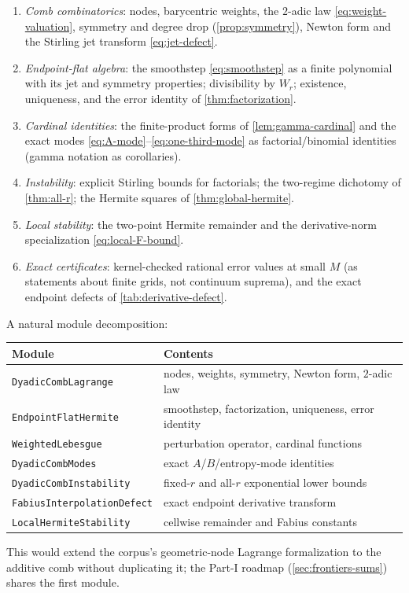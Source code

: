 \documentclass[11pt,oneside]{article}
\numberwithin{equation}{section}
\theoremstyle{definition}
\theoremstyle{remark}
\begin{document}
\begin{enumerate}
\item\emph{Comb combinatorics}: nodes, barycentric weights, the
$2$-adic law \eqref{eq:weight-valuation}, symmetry and degree drop
(\cref{prop:symmetry}), Newton form and the Stirling jet transform
\eqref{eq:jet-defect}.
\item\emph{Endpoint-flat algebra}: the smoothstep
\eqref{eq:smoothstep} as a finite polynomial with its jet and
symmetry properties; divisibility by $W_r$; existence, uniqueness,
and the error identity of \cref{thm:factorization}.
\item\emph{Cardinal identities}: the finite-product forms of
\cref{lem:gamma-cardinal} and the exact modes
\eqref{eq:A-mode}--\eqref{eq:one-third-mode} as factorial/binomial
identities (gamma notation as corollaries).
\item\emph{Instability}: explicit Stirling bounds for factorials; the
two-regime dichotomy of \cref{thm:all-r}; the Hermite squares of
\cref{thm:global-hermite}.
\item\emph{Local stability}: the two-point Hermite remainder and the
derivative-norm specialization \eqref{eq:local-F-bound}.
\item\emph{Exact certificates}: kernel-checked rational error values
at small $M$ (as statements about finite grids, not continuum
suprema), and the exact endpoint defects of
\cref{tab:derivative-defect}.
\end{enumerate}

A natural module decomposition:
\begin{center}
\small
\begin{tabular}{@{}ll@{}}
\toprule
Module & Contents \\
\midrule
\nolinkurl{DyadicCombLagrange} & nodes, weights, symmetry, Newton form, $2$-adic law \\
\nolinkurl{EndpointFlatHermite} & smoothstep, factorization, uniqueness, error identity \\
\nolinkurl{WeightedLebesgue} & perturbation operator, cardinal functions \\
\nolinkurl{DyadicCombModes} & exact $A$/$B$/entropy-mode identities \\
\nolinkurl{DyadicCombInstability} & fixed-$r$ and all-$r$ exponential lower bounds \\
\nolinkurl{FabiusInterpolationDefect} & exact endpoint derivative transform \\
\nolinkurl{LocalHermiteStability} & cellwise remainder and Fabius constants \\
\bottomrule
\end{tabular}
\end{center}
This would extend the corpus's geometric-node Lagrange formalization
to the additive comb without duplicating it; the Part-I roadmap
(\cref{sec:frontiers-sums}) shares the first module.
\end{document}
